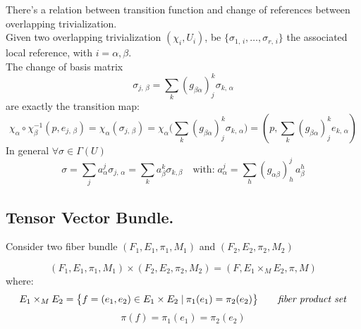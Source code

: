 \documentclass[a4paper,12pt]{scrartcl}    %
\begin{document}
\begin{observation}
There's a relation between transition function and change of references between overlapping trivialization.
\\ Given two overlapping trivialization $( \chi_{i} , U_{i})$, be $\{\sigma_{1,\, i}, \ldots, \sigma_{r,\, i} \} $ the associated local reference, with $i= \alpha , \beta$.
\\ The change of basis matrix 
	\begin{displaymath}
		\sigma_{j, \, \beta} = \sum_{k} ( g_{\beta \alpha})^{k}_j \sigma_{k, \, \alpha}
	\end{displaymath}
 are exactly the transition map:
 \begin{displaymath}
 \chi_\alpha \circ \chi_\beta^{-1} ( p, e_{j, \, \beta}) = \chi_{\alpha}(\sigma_{j, \, \beta}) = \chi_{\alpha}\big(\sum_{k} ( g_{\beta \alpha})^{k}_j \sigma_{k, \, \alpha}  \big) = ( p, \sum_{k} ( g_{\beta \alpha})^{k}_j e_{k, \, \alpha} )
 \end{displaymath}
\vspace{10mm}
 In general $\forall \sigma \in \Gamma(U)$
 \begin{displaymath}
  \sigma = \sum_j a^j_\alpha  \sigma_{j, \, \alpha} = \sum_k a^k_\beta \sigma_{k, \beta} \quad \textrm{with:} \; a^j_\alpha = \sum_h (g_{\alpha \beta} )^j_h \, a^h_{\beta}
 \end{displaymath}
\end{observation}

\subsection{Tensor Vector Bundle.}

Consider two fiber bundle $(F_1, E_1, \pi_1, M_1)$ and $(F_2, E_2, \pi_2, M_2)$ 
\begin{definition}\label{Def: bundleproduct}
\begin{displaymath}
(F_1, E_1, \pi_1, M_1) \times (F_2, E_2, \pi_2, M_2) = (F, E_1 \times_M E_2 , \pi , M)
\end{displaymath}
where:
$$ E_1 \times_M E_2 = \big\{ f = (e_1, e_2) \in E_1 \times E_2 \; \vert \: \pi_1(e_1) = \pi_2 (e_2) \big\} \qquad \textrm{\emph{fiber product set}} $$
$$ \pi (f) = \pi_1(e_1) = \pi_2(e_2)  $$
\end{definition}
\end{document}
